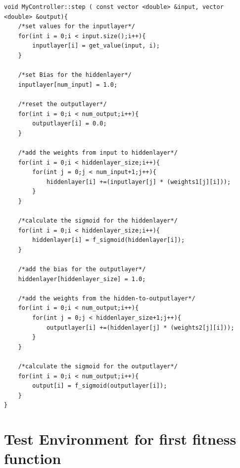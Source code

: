 \begin{lstlisting}[caption = GA assisted Artificial Neural Network step function]
void MyController::step ( const vector <double> &input, vector <double> &output){
    /*set values for the inputlayer*/
    for(int i = 0;i < input.size();i++){
        inputlayer[i] = get_value(input, i);
    }

    /*set Bias for the hiddenlayer*/
    inputlayer[num_input] = 1.0;

    /*reset the outputlayer*/
    for(int i = 0;i < num_output;i++){
        outputlayer[i] = 0.0;
    }

    /*add the weights from input to hiddenlayer*/
    for(int i = 0;i < hiddenlayer_size;i++){
        for(int j = 0;j < num_input+1;j++){
            hiddenlayer[i] +=(inputlayer[j] * (weights1[j][i]));
        }
    }

    /*calculate the sigmoid for the hiddenlayer*/
    for(int i = 0;i < hiddenlayer_size;i++){
        hiddenlayer[i] = f_sigmoid(hiddenlayer[i]);
    }

    /*add the bias for the outputlayer*/
    hiddenlayer[hiddenlayer_size] = 1.0;

    /*add the weights from the hidden-to-outputlayer*/
    for(int i = 0;i < num_output;i++){
        for(int j = 0;j < hiddenlayer_size+1;j++){
            outputlayer[i] +=(hiddenlayer[j] * (weights2[j][i]));
        }
    }

    /*calculate the sigmoid for the outputlayer*/
    for(int i = 0;i < num_output;i++){
        output[i] = f_sigmoid(outputlayer[i]);
    }
}
\end{lstlisting}
\newpage
\section{Test Environment for first fitness function}

